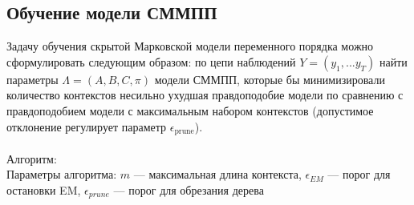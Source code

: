 \documentclass{matmex-diploma-custom}
\begin{document}
\subsection{Обучение модели СММПП}
Задачу обучения скрытой Марковской модели переменного порядка можно сформулировать следующим образом: 
по цепи наблюдений $ Y = (y_{1}, ... y_{T}) $ найти параметры $\Lambda = (A,B,C,\pi)$ модели СММПП, которые бы минимизировали количество контекстов несильно ухудшая правдоподобие модели по сравнению с правдоподобием модели с максимальным набором контекстов (допустимое отклонение регулирует параметр $ \epsilon_{\text{prune}} $).
\\\\
{\large Алгоритм:}
\\
Параметры алгоритма: 
$ m $ --- максимальная длина контекста, 
$ \epsilon_{\textit{EM}} $ --- порог для остановки EM,
$ \epsilon_{\textit{prune}} $ --- порог для обрезания дерева
\\
\end{document}

